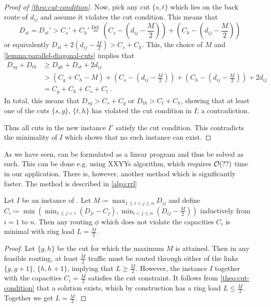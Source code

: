 \begin{proof}[Proof of \cref{theo:cut-condition}]
	Now, pick any cut $\{s, t\}$ which lies on the back route of $d_{ij}$ and assume it violates the cut condition.
	This means that
	\begin{equation}
		D_{st} = D_{st}' > C_s' + C_h' \stackrel{\mathrm{Def.}}{=} \left(C_s - \left(d_{ij} - \frac{M}{2}\right)\right) + \left(C_h - \left(d_{ij} - \frac{M}{2}\right)\right)
	\end{equation}
	or equivalently $D_{st} +  2(d_{ij} - \frac{M}{2}) > C_s + C_h$.
	This, the choice of $M$ and \cref{lemma:parallel-diagonal-cuts} implies that
	\begin{align}
		D_{sg} + D_{th} &\geq D_{gh} + D_{st} + 2 d_{ij}\\
		&> (C_g + C_h - M) +  \left(C_s - \left(d_{ij} - \frac{M}{2}\right)\right) + \left(C_h - \left(d_{ij} - \frac{M}{2}\right)\right) + 2 d_{ij}\\
		&= C_g + C_h + C_s + C_t \ .
	\end{align}
	In total, this means that $D_{sg} > C_s + C_g$ or $D_{th} > C_t + C_h$, showing that at least one of the cuts $\{s, g\}$, $\{t, h\}$ has violated the cut condition in $I$; a contradiction.
	
	Thus all cuts in the new instance $I'$ satisfy the cut condition.
	This contradicts the minimality of $I$ which shows that no such instance can exist.
\end{proof}

As we have seen, \RRL can be formulated as a linear program and thus be solved as such.
This can be done e.g. using XXYYs algorithm, which requires $\mathcal{O}(??)$ time in our application.
There is, however, another method which is significantly faster.
The method is described in \cref{algo:rrl}






\begin{lemma}
	Let $I$ be an instance of \RRL.
	Let $M \coloneqq \max_{1 \leq i < j \leq n} D_{ij}$ and define $C_i \coloneqq \min \left(\min_{1 \leq j < i}(D_{ji} - C_j), \min_{i < j \leq n}(D_{ij} - \frac{M}{2})\right)$ inductively from $i = 1$ to $n$.
	Then any routing $\phi$ which does not violate the capacities $C_i$ is minimal with ring load $L = \frac{M}{2}$.
\end{lemma}
\begin{proof}
	Let $\{g, h\}$ be the cut for which the maximum $M$ is attained.
	Then in any feasible routing, at least $\frac{M}{2}$ traffic must be routed through either of the links $\{g, g+1\}$, $\{h, h+1\}$, implying that $L \geq \frac{M}{2}$.
	However, the instance $I$ together with the capacities $C_i = \frac{M}{2}$ satisfies the cut constraint.
	It follows from \cref{theo:cut-condition} that a solution exists, which by construction has a ring load $L \leq \frac{M}{2}$.
	Together we get $L = \frac{M}{2}$.
\end{proof}

